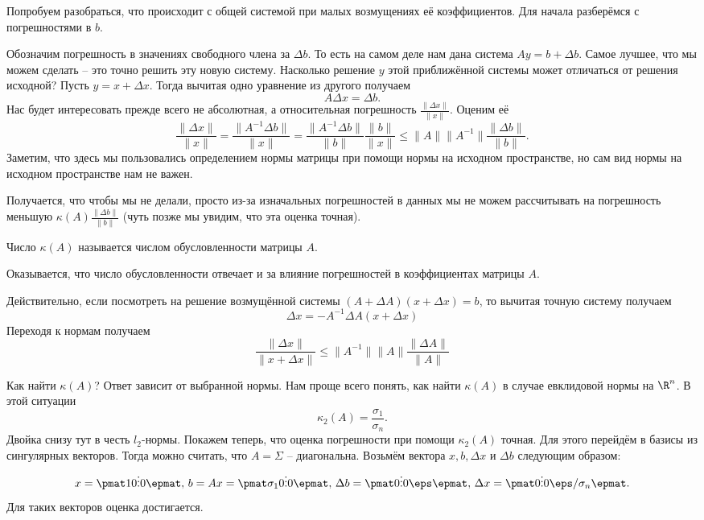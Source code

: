 Попробуем разобраться, что происходит с общей системой при малых возмущениях её коэффициентов. Для начала разберёмся с погрешностями в $b$.

Обозначим погрешность в значениях свободного члена за $\Delta b$. То есть на самом деле нам дана система $Ay=b+\Delta b$. Самое лучшее, что мы можем сделать -- это точно решить эту новую систему. Насколько решение $y$ этой приближённой системы может отличаться от решения исходной? Пусть $y=x+\Delta x$. Тогда вычитая одно уравнение из другого получаем
$$A \Delta x= \Delta b.$$
Нас будет интересовать прежде всего не абсолютная, а относительная погрешность $\frac{\|\Delta x\|}{\|x\|}$. Оценим её
$$\frac{\|\Delta x\|}{\|x\|}=\frac{\|A^{-1} \Delta b \|}{\|x\|}=\frac{\|A^{-1} \Delta b \|}{\|b\|} \frac{\|b\|}{\|x\|} \leq \|A\| \|A^{-1}\| \frac{\|\Delta b\|}{\|b\|}.$$
Заметим, что здесь мы пользовались определением нормы матрицы при помощи нормы на исходном пространстве, но сам вид нормы на исходном пространстве нам не важен.

Получается, что чтобы мы не делали, просто из-за изначальных погрешностей в данных мы не можем рассчитывать  на погрешность меньшую $\kappa(A)\frac{\|\Delta b\|}{\|b\|}$
(чуть позже мы увидим, что эта оценка точная). 

\dfn Число $\kappa(A)$ называется числом обусловленности матрицы $A$.
\edfn

Оказывается, что число обусловленности отвечает и за влияние погрешностей в коэффициентах матрицы $A$.

Действительно, если посмотреть на решение возмущённой системы $(A+\Delta A)(x+\Delta x)=b$, то вычитая точную систему получаем
$$\Delta x= -A^{-1}\Delta A (x+\Delta x)$$
Переходя к нормам получаем
$$\frac{\|\Delta x\|}{\|x+\Delta x\|}\leq \|A^{-1}\| \|A\| \frac{\|\Delta A\|}{\|A\|}$$

Как найти $\kappa(A)$? Ответ зависит от выбранной нормы. Нам проще всего понять, как найти $\kappa(A)$ в случае евклидовой нормы на $\R^n$. В этой ситуации $$\kappa_2(A)=\frac{\sigma_1}{\sigma_n}.$$
Двойка снизу тут в честь $l_2$-нормы.
Покажем теперь, что оценка погрешности при помощи $\kappa_2(A)$ точная. Для этого перейдём в базисы из сингулярных векторов. Тогда можно считать, что $A=\Sigma$ -- диагональна. Возьмём вектора $x,b,\Delta x$ и $\Delta b$ следующим образом:
$$x=\pmat 1 \\ 0\\ \vdots \\ 0 \epmat,\, b=Ax=\pmat \sigma_1 \\ 0\\ \vdots \\ 0 \epmat, \, \Delta b = \pmat 0 \\ \vdots \\ 0 \\ \eps \epmat, \, \Delta x=  \pmat 0 \\  \vdots \\ 0 \\ \eps/\sigma_n\epmat.$$
Для таких векторов оценка достигается.

